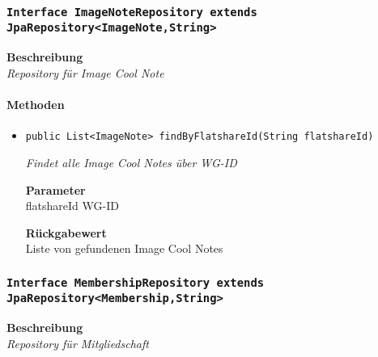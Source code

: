     \subsubsection{\texttt{Interface ImageNoteRepository extends JpaRepository<ImageNote,String>}}
    \textbf{Beschreibung} \\
    \textit{Repository für Image Cool Note}
    \paragraph*{Methoden}
    \begin{itemize}
    	\item{\texttt{public List<ImageNote> findByFlatshareId(String flatshareId)}}
    	
    	\textit{Findet alle Image Cool Notes über WG-ID}
    	
    	\textbf{Parameter} \\
    	flatshareId WG-ID
    	
    	\textbf{Rückgabewert} \\
    	Liste von gefundenen Image Cool Notes
    \end{itemize}
    \subsubsection{\texttt{Interface MembershipRepository extends JpaRepository<Membership,String>}}
    \textbf{Beschreibung} \\
    \textit{Repository für Mitgliedschaft}
